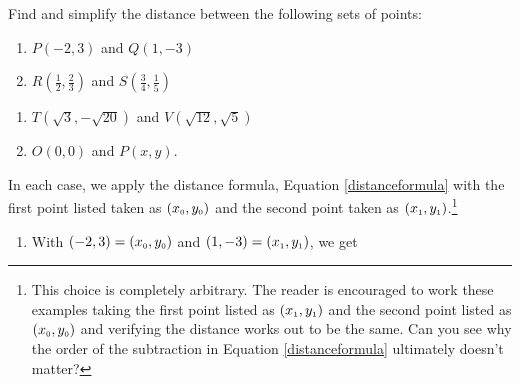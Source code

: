 \documentclass{ximera}
\begin{document}
\begin{example} \label{distanceexample1} Find and simplify the distance between the following sets of points:

\begin{multicols}{2}
\begin{enumerate}

\item $P(-2,3)$ and  $Q(1,-3)$ 

\item $R\left( \frac{1}{2}, \frac{2}{3}\right)$ and $S\left( \frac{3}{4}, \frac{1}{5}\right)$ 

\setcounter{HW}{\value{enumi}}
\end{enumerate}
\end{multicols}

\begin{multicols}{2}
\begin{enumerate}
\setcounter{enumi}{\value{HW}}

\item  $T(\sqrt{3}, -\sqrt{20})$ and $V(\sqrt{12}, \sqrt{5})$

\item   $O(0,0)$ and $P(x,y)$. 

\end{enumerate}
\end{multicols}

\medskip

  In each case, we apply the distance formula, Equation \ref{distanceformula} with the first point listed taken as  $\left(x_{\mbox{\tiny$0$}}, y_{\mbox{\tiny$0$}}\right)$ and the second point taken as $\left(x_{\mbox{\tiny$1$}}, y_{\mbox{\tiny$1$}}\right)$.\footnote{This choice is completely arbitrary.  The reader is encouraged to work these examples taking the first point listed as $\left(x_{\mbox{\tiny$1$}}, y_{\mbox{\tiny$1$}}\right)$ and the second point listed as $\left(x_{\mbox{\tiny$0$}}, y_{\mbox{\tiny$0$}}\right)$ and verifying the distance works out to be the same.  Can you see why the order of the subtraction in Equation \ref{distanceformula} ultimately doesn't matter?}

\begin{enumerate}

\item With $(-2,3) =  \left(x_{\mbox{\tiny$0$}}, y_{\mbox{\tiny$0$}}\right)$ and  $(1,-3) = \left(x_{\mbox{\tiny$1$}}, y_{\mbox{\tiny$1$}}\right)$, we get


\end{enumerate}
\end{example}
\end{document}
